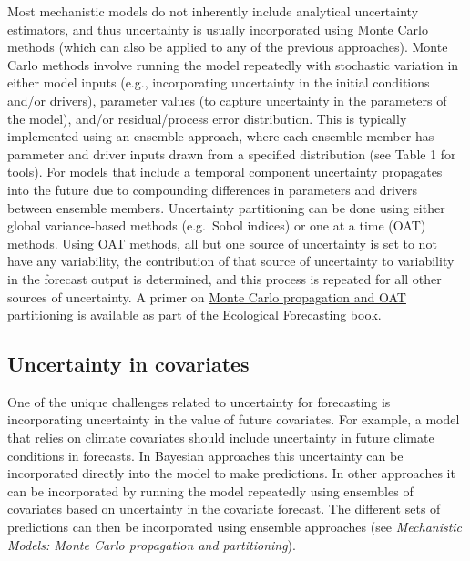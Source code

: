 \documentclass[
]{book}
\begin{document}
Most mechanistic models do not inherently include analytical uncertainty estimators, and thus uncertainty is usually incorporated using Monte Carlo methods (which can also be applied to any of the previous approaches). Monte Carlo methods involve running the model repeatedly with stochastic variation in either model inputs (e.g., incorporating uncertainty in the initial conditions and/or drivers), parameter values (to capture uncertainty in the parameters of the model), and/or residual/process error distribution. This is typically implemented using an ensemble approach, where each ensemble member has parameter and driver inputs drawn from a specified distribution (see Table 1 for tools). For models that include a temporal component uncertainty propagates into the future due to compounding differences in parameters and drivers between ensemble members. Uncertainty partitioning can be done using either global variance-based methods (e.g.~Sobol indices) or one at a time (OAT) methods. Using OAT methods, all but one source of uncertainty is set to not have any variability, the contribution of that source of uncertainty to variability in the forecast output is determined, and this process is repeated for all other sources of uncertainty. A primer on \href{https://github.com/EcoForecast/EF_Activities/blob/master/Chapter_11_UncertAnalysis.Rmd}{Monte Carlo propagation and OAT partitioning} is available as part of the \href{https://press.princeton.edu/books/hardcover/9780691160573/ecological-forecasting}{Ecological Forecasting book}.

\hypertarget{uncertainty-in-covariates}{%
\subsection{Uncertainty in covariates}\label{uncertainty-in-covariates}}

One of the unique challenges related to uncertainty for forecasting is incorporating uncertainty in the value of future covariates. For example, a model that relies on climate covariates should include uncertainty in future climate conditions in forecasts. In Bayesian approaches this uncertainty can be incorporated directly into the model to make predictions. In other approaches it can be incorporated by running the model repeatedly using ensembles of covariates based on uncertainty in the covariate forecast. The different sets of predictions can then be incorporated using ensemble approaches (see \emph{Mechanistic Models: Monte Carlo propagation and partitioning}).
\end{document}
